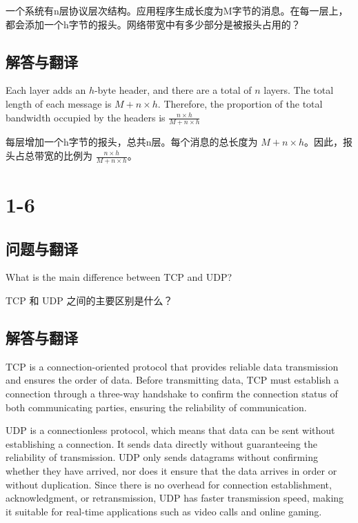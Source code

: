 一个系统有n层协议层次结构。应用程序生成长度为M字节的消息。在每一层上，都会添加一个h字节的报头。网络带宽中有多少部分是被报头占用的？

\subsection{解答与翻译}

Each layer adds an \( h \)-byte header, and there are a total of \( n \) layers. The total length of each message is \( M + n \times h \). Therefore, the proportion of the total bandwidth occupied by the headers is \( \frac{n \times h}{M + n \times h} \)

每层增加一个h字节的报头，总共n层。每个消息的总长度为 $M + n \times h$。因此，报头占总带宽的比例为 $\frac{n \times h}{M + n \times h}$。

\section{1-6}

\subsection{问题与翻译}

What is the main difference between TCP and UDP?

TCP 和 UDP 之间的主要区别是什么？

\subsection{解答与翻译}

TCP is a connection-oriented protocol that provides reliable data transmission and ensures the order of data. Before transmitting data, TCP must establish a connection through a three-way handshake to confirm the connection status of both communicating parties, ensuring the reliability of communication.

UDP is a connectionless protocol, which means that data can be sent without establishing a connection. It sends data directly without guaranteeing the reliability of transmission. UDP only sends datagrams without confirming whether they have arrived, nor does it ensure that the data arrives in order or without duplication. Since there is no overhead for connection establishment, acknowledgment, or retransmission, UDP has faster transmission speed, making it suitable for real-time applications such as video calls and online gaming.

